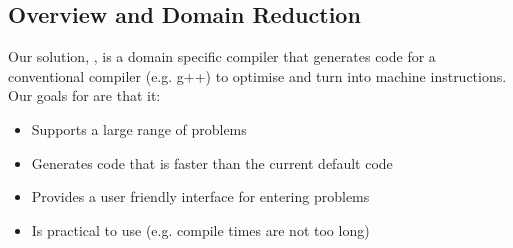 \newcommand{\vecc}[1]{\vec{\mathbf{#1}}}

\subsection{Overview and Domain Reduction}
Our solution, \phlat, is a domain specific compiler that generates code for a conventional compiler (e.g. g++) to optimise and turn into machine instructions.
Our goals for \phlat are that it:
\begin{itemize}
    \item Supports a large range of problems
    \item Generates code that is faster than the current default code
    \item Provides a user friendly interface for entering problems
    \item Is practical to use (e.g. compile times are not too long)
\end{itemize}

